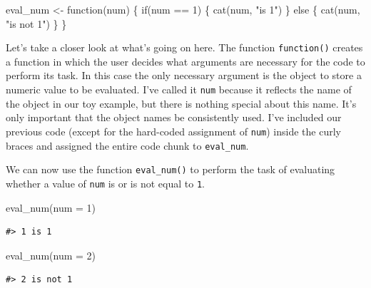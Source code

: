 \documentclass[
  letterpaper,
]{latex/krantz}
\newenvironment{Shaded}{\begin{snugshade}}{\end{snugshade}}
\newcommand{\AttributeTok}[1]{\textcolor[rgb]{0.40,0.45,0.13}{#1}}
\newcommand{\ControlFlowTok}[1]{\textcolor[rgb]{0.00,0.23,0.31}{#1}}
\newcommand{\DecValTok}[1]{\textcolor[rgb]{0.68,0.00,0.00}{#1}}
\newcommand{\FunctionTok}[1]{\textcolor[rgb]{0.28,0.35,0.67}{#1}}
\newcommand{\NormalTok}[1]{\textcolor[rgb]{0.00,0.23,0.31}{#1}}
\newcommand{\OtherTok}[1]{\textcolor[rgb]{0.00,0.23,0.31}{#1}}
\newcommand{\SpecialCharTok}[1]{\textcolor[rgb]{0.37,0.37,0.37}{#1}}
\newcommand{\StringTok}[1]{\textcolor[rgb]{0.13,0.47,0.30}{#1}}
\begin{document}
\begin{Shaded}
\begin{Highlighting}[]
\NormalTok{eval\_num }\OtherTok{\textless{}{-}} \ControlFlowTok{function}\NormalTok{(num) \{}
  \ControlFlowTok{if}\NormalTok{(num }\SpecialCharTok{==} \DecValTok{1}\NormalTok{) \{ }
  \FunctionTok{cat}\NormalTok{(num, }\StringTok{"is 1"}\NormalTok{) }
\NormalTok{  \} }\ControlFlowTok{else}\NormalTok{ \{}
  \FunctionTok{cat}\NormalTok{(num, }\StringTok{"is not 1"}\NormalTok{)}
\NormalTok{  \}}
\NormalTok{\}}
\end{Highlighting}
\end{Shaded}

Let's take a closer look at what's going on here. The function
\texttt{function()} creates a function in which the user decides what
arguments are necessary for the code to perform its task. In this case
the only necessary argument is the object to store a numeric value to be
evaluated. I've called it \texttt{num} because it reflects the name of
the object in our toy example, but there is nothing special about this
name. It's only important that the object names be consistently used.
I've included our previous code (except for the hard-coded assignment of
\texttt{num}) inside the curly braces and assigned the entire code chunk
to \texttt{eval\_num}.

We can now use the function \texttt{eval\_num()} to perform the task of
evaluating whether a value of \texttt{num} is or is not equal to
\texttt{1}.

\begin{Shaded}
\begin{Highlighting}[]
\FunctionTok{eval\_num}\NormalTok{(}\AttributeTok{num =} \DecValTok{1}\NormalTok{)}
\end{Highlighting}
\end{Shaded}

\begin{verbatim}
#> 1 is 1
\end{verbatim}

\begin{Shaded}
\begin{Highlighting}[]
\FunctionTok{eval\_num}\NormalTok{(}\AttributeTok{num =} \DecValTok{2}\NormalTok{)}
\end{Highlighting}
\end{Shaded}

\begin{verbatim}
#> 2 is not 1
\end{verbatim}
\end{document}
